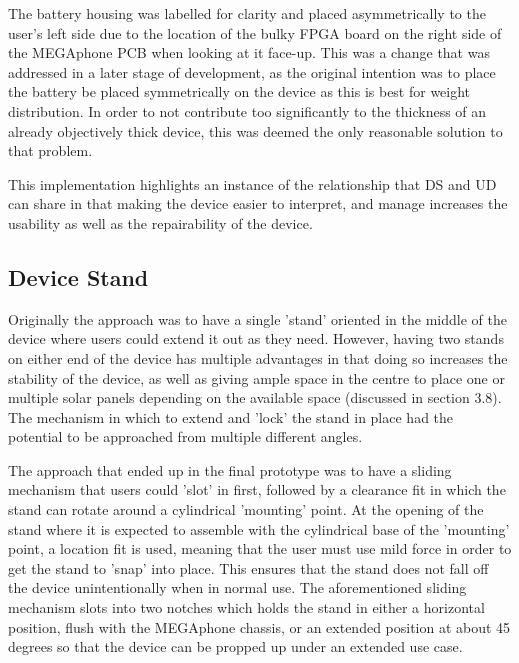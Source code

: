 The battery housing was labelled for clarity and placed asymmetrically to the user's left side due to the location of the bulky FPGA board on the right side of the MEGAphone PCB when looking at it face-up.
This was a change that was addressed in a later stage of development, as the original intention was to place the battery be placed symmetrically on the device as this is best for weight distribution.
In order to not contribute too significantly to the thickness of an already objectively thick device, this was deemed the only reasonable solution to that problem.

This implementation highlights an instance of the relationship that DS and UD can share in that making the device easier to interpret, and manage increases the usability as well as the repairability of the device.

\subsection{Device Stand}

Originally the approach was to have a single 'stand' oriented in the middle of the device where users could extend it out as they need.
However, having two stands on either end of the device has multiple advantages in that doing so increases the stability of the device, as well as giving ample space in the centre to place one or multiple solar panels depending on the available space (discussed in section 3.8).
The mechanism in which to extend and 'lock' the stand in place had the potential to be approached from  multiple different angles.

The approach that ended up in the final prototype was to have a sliding mechanism that users could 'slot' in first, followed by a clearance fit in which the stand can rotate around a cylindrical 'mounting' point.  %
At the opening of the stand where it is expected to assemble with the cylindrical base of the 'mounting' point, a location fit is used, meaning that the user must use mild force in order to get the stand to 'snap' into place.
This ensures that the stand does not fall off the device unintentionally when in normal use.
The aforementioned sliding mechanism slots into two notches which holds the stand in either a horizontal position, flush with the MEGAphone chassis, or an extended position at about 45 degrees so that the device can be propped up under an extended use case.

